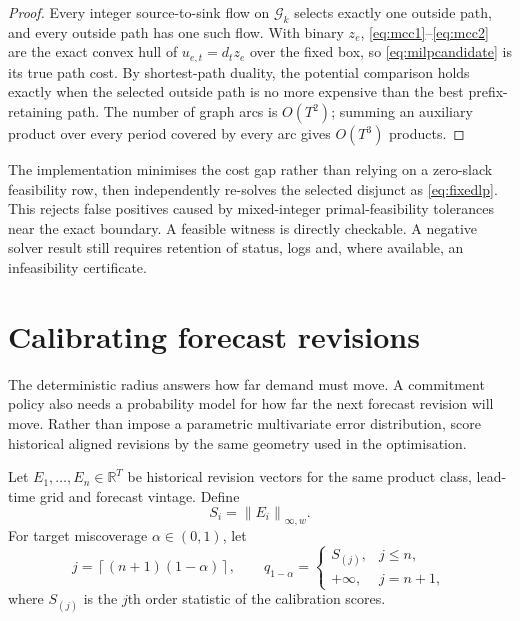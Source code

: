 \documentclass[11pt]{article}
\theoremstyle{definition}
\newcommand{\R}{\mathbb{R}}
\newcommand{\cG}{\mathcal{G}}
\newcommand{\norm}[1]{\left\lVert #1\right\rVert}
\begin{document}
\begin{proof}
Every integer source-to-sink flow on $\cG_k$ selects exactly one outside path, and every outside path has one such flow. With binary $z_e$, \eqref{eq:mcc1}--\eqref{eq:mcc2} are the exact convex hull of $u_{e,t}=d_tz_e$ over the fixed box, so \eqref{eq:milpcandidate} is its true path cost. By shortest-path duality, the potential comparison holds exactly when the selected outside path is no more expensive than the best prefix-retaining path. The number of graph arcs is $O(T^2)$; summing an auxiliary product over every period covered by every arc gives $O(T^3)$ products.
\end{proof}

The implementation minimises the cost gap rather than relying on a zero-slack feasibility row, then independently re-solves the selected disjunct as \eqref{eq:fixedlp}. This rejects false positives caused by mixed-integer primal-feasibility tolerances near the exact boundary. A feasible witness is directly checkable. A negative solver result still requires retention of status, logs and, where available, an infeasibility certificate.

\section{Calibrating forecast revisions}

The deterministic radius answers how far demand must move. A commitment policy also needs a probability model for how far the next forecast revision will move. Rather than impose a parametric multivariate error distribution, score historical aligned revisions by the same geometry used in the optimisation.

Let $E_1,\ldots,E_n\in\R^T$ be historical revision vectors for the same product class, lead-time grid and forecast vintage. Define
\begin{equation}\label{eq:scores}
S_i=\norm{E_i}_{\infty,w}.
\end{equation}
For target miscoverage $\alpha\in(0,1)$, let
\begin{equation}\label{eq:conformalrank}
j=\left\lceil(n+1)(1-\alpha)\right\rceil,
\qquad
q_{1-\alpha}=
\begin{cases}
S_{(j)},&j\le n,\\
+\infty,&j=n+1,
\end{cases}
\end{equation}
where $S_{(j)}$ is the $j$th order statistic of the calibration scores.
\end{document}
